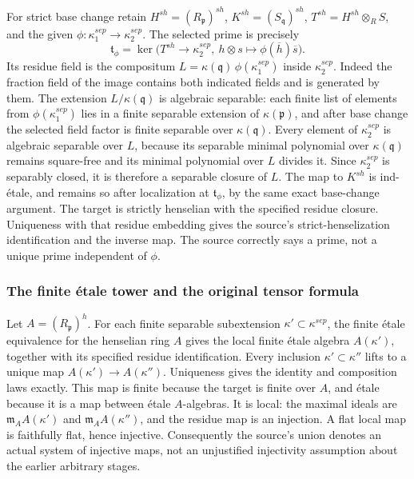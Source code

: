 For strict base change retain \(H^{sh}=(R_{\mathfrak p})^{sh}\), \(K^{sh}=(S_{\mathfrak q})^{sh}\), \(T^{sh}=H^{sh}\otimes_R S\), and the given \(\phi:\kappa_1^{sep}\to\kappa_2^{sep}\). The selected prime is precisely \[
 \mathfrak t_\phi=\ker\bigl(T^{sh}\longrightarrow\kappa_2^{sep},
            \ h\otimes s\longmapsto\phi(\overline h)\overline s\bigr).
\] Its residue field is the compositum \(L=\kappa(\mathfrak q)\,\phi(\kappa_1^{sep})\) inside \(\kappa_2^{sep}\). Indeed the fraction field of the image contains both indicated fields and is generated by them. The extension \(L/\kappa(\mathfrak q)\) is algebraic separable: each finite list of elements from \(\phi(\kappa_1^{sep})\) lies in a finite separable extension of \(\kappa(\mathfrak p)\), and after base change the selected field factor is finite separable over \(\kappa(\mathfrak q)\). Every element of \(\kappa_2^{sep}\) is algebraic separable over \(L\), because its separable minimal polynomial over \(\kappa(\mathfrak q)\) remains square-free and its minimal polynomial over \(L\) divides it. Since \(\kappa_2^{sep}\) is separably closed, it is therefore a separable closure of \(L\). The map to \(K^{sh}\) is ind-étale, and remains so after localization at \(\mathfrak t_\phi\), by the same exact base-change argument. The target is strictly henselian with the specified residue closure. Uniqueness with that residue embedding gives the source's strict-henselization identification and the inverse map. The source correctly says a prime, not a unique prime independent of \(\phi\).

\subsubsection{The finite étale tower and the original tensor formula}\label{algebra-proof-060-the-finite-uxe9tale-tower-and-the-original-tensor-formula}

Let \(A=(R_{\mathfrak p})^h\). For each finite separable subextension \(\kappa'\subset\kappa^{sep}\), the finite étale equivalence for the henselian ring \(A\) gives the local finite étale algebra \(A(\kappa')\), together with its specified residue identification. Every inclusion \(\kappa'\subset\kappa''\) lifts to a unique map \(A(\kappa')\to A(\kappa'')\). Uniqueness gives the identity and composition laws exactly. This map is finite because the target is finite over \(A\), and étale because it is a map between étale \(A\)-algebras. It is local: the maximal ideals are \(\mathfrak m_A A(\kappa')\) and \(\mathfrak m_A A(\kappa'')\), and the residue map is an injection. A flat local map is faithfully flat, hence injective. Consequently the source's union denotes an actual system of injective maps, not an unjustified injectivity assumption about the earlier arbitrary stages.

